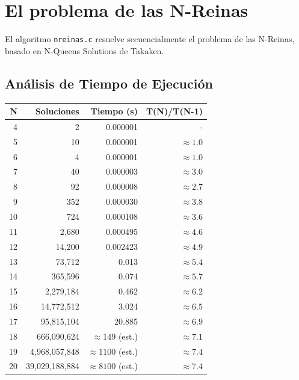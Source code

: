 \documentclass[11pt,a4paper]{article}
\begin{document}
\section{El problema de las N-Reinas}

El algoritmo \texttt{nreinas.c} resuelve secuencialmente el problema de las N-Reinas, basado en N-Queens Solutions de Takaken.

\subsection*{Análisis de Tiempo de Ejecución}

\begin{center}
\begin{tabular}{|r|r|r|r|}
\hline
\textbf{N} & \textbf{Soluciones} & \textbf{Tiempo (s)} & \textbf{T(N)/T(N-1)} \\
\hline
 4 & 2                  & 0.000001             & -              \\
 5 & 10                 & 0.000001             & $\approx 1.0$  \\
 6 & 4                  & 0.000001             & $\approx 1.0$  \\
 7 & 40                 & 0.000003             & $\approx 3.0$  \\
 8 & 92                 & 0.000008             & $\approx 2.7$  \\
 9 & 352                & 0.000030             & $\approx 3.8$  \\
10 & 724                & 0.000108             & $\approx 3.6$  \\
11 & 2,680              & 0.000495             & $\approx 4.6$  \\
12 & 14,200             & 0.002423             & $\approx 4.9$  \\
13 & 73,712             & 0.013                & $\approx 5.4$  \\
14 & 365,596            & 0.074                & $\approx 5.7$  \\
15 & 2,279,184          & 0.462                & $\approx 6.2$  \\
16 & 14,772,512         & 3.024                & $\approx 6.5$  \\
17 & 95,815,104         & 20.885               & $\approx 6.9$  \\
18 & 666,090,624        & $\approx 149$ (est.) & $\approx 7.1$  \\
19 & 4,968,057,848      & $\approx 1100$ (est.)& $\approx 7.4$  \\
20 & 39,029,188,884     & $\approx 8100$ (est.)& $\approx 7.4$  \\
\hline
\end{tabular}
\end{center}
\end{document}
